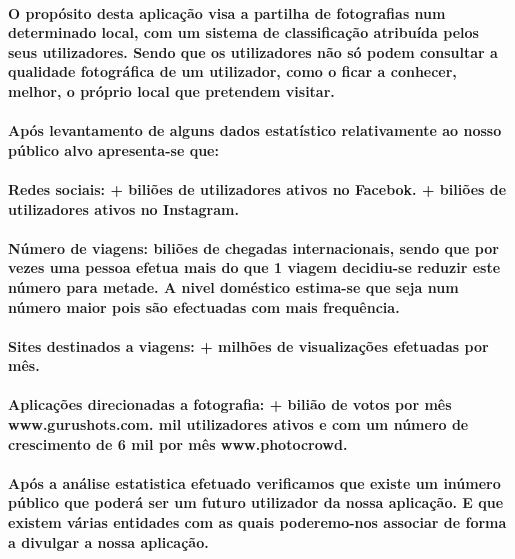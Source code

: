 \paragraph{
O propósito desta aplicação visa a partilha de fotografias num determinado local, com um sistema de classificação atribuída pelos seus utilizadores. Sendo que os utilizadores não só podem consultar a qualidade fotográfica de um utilizador, como o ficar a conhecer, melhor, o próprio local que pretendem visitar.
}
\paragraph{
Após levantamento de alguns dados estatístico relativamente ao nosso público alvo apresenta-se que:
}
\paragraph{
Redes sociais:
\newline
{}+ biliões de utilizadores ativos no Facebok.
\newline
{}+ biliões de utilizadores ativos no Instagram.
}
\paragraph{
Número de viagens:
\newline
{} biliões de chegadas internacionais, sendo que por vezes uma pessoa efetua mais do que 1 viagem decidiu-se reduzir este número para metade.
\newline
\textbullet A nivel doméstico estima-se que seja num número maior pois são efectuadas com mais frequência.
}
\paragraph{
Sites destinados a viagens:
\newline
{}+ milhões de visualizações efetuadas por mês.
}
\paragraph{
\textbullet Aplicações direcionadas a fotografia:
\newline
{}+ bilião de votos por mês www.gurushots.com.
\newline
{} mil utilizadores ativos e com um número de crescimento de 6 mil por mês www.photocrowd.
}
\paragraph{
Após a análise estatistica efetuado verificamos que existe um inúmero público que poderá ser um futuro utilizador da nossa aplicação. E que existem várias entidades com as quais poderemo-nos associar de forma a divulgar a nossa aplicação.
}
